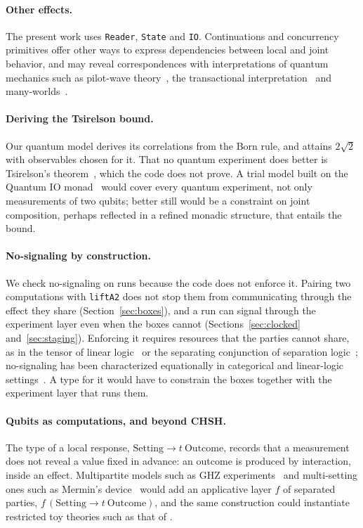 \documentclass[11pt]{article}
\newcommand{\hs}{\lstinline[style=hask,basicstyle=\ttfamily,frame=none]}
\begin{document}
\paragraph{Other effects.} The present work uses \hs|Reader|, \hs|State| and \hs|IO|. Continuations and concurrency primitives offer other ways to express dependencies between local and joint behavior, and may reveal correspondences with interpretations of quantum mechanics such as pilot-wave theory~\citep{Bohm1952}, the transactional interpretation~\citep{Cramer1986} and many-worlds~\citep{Everett1957}.

\paragraph{Deriving the Tsirelson bound.} Our quantum model derives its correlations from the Born rule, and attains $2\sqrt2$ with observables chosen for it. That no quantum experiment does better is Tsirelson's theorem~\citep{Tsirelson1980}, which the code does not prove. A trial model built on the Quantum IO monad~\citep{AltenkirchGreen2010} would cover every quantum experiment, not only measurements of two qubits; better still would be a constraint on joint composition, perhaps reflected in a refined monadic structure, that entails the bound.

\paragraph{No-signaling by construction.} We check no-signaling on runs because the code does not enforce it. Pairing two computations with \hs|liftA2| does not stop them from communicating through the effect they share (Section~\ref{sec:boxes}), and a run can signal through the experiment layer even when the boxes cannot (Sections~\ref{sec:clocked} and~\ref{sec:staging}). Enforcing it requires resources that the parties cannot share, as in the tensor of linear logic~\citep{Girard1987} or the separating conjunction of separation logic~\citep{Reynolds2002}; no-signaling has been characterized equationally in categorical and linear-logic settings~\citep{KissingerUijlen2017,LindenhoviusZamdzhiev2025}. A type for it would have to constrain the boxes together with the experiment layer that runs them.

\paragraph{Qubits as computations, and beyond CHSH.} The type of a local response, $\mathrm{Setting} \longrightarrow t\ \mathrm{Outcome}$, records that a measurement does not reveal a value fixed in advance: an outcome is produced by interaction, inside an effect. Multipartite models such as GHZ experiments~\citep{GHZ1990} and multi-setting ones such as Mermin's device~\citep{Mermin1981} would add an applicative layer $f$ of separated parties, $f\,(\mathrm{Setting} \longrightarrow t\ \mathrm{Outcome})$, and the same construction could instantiate restricted toy theories such as that of \citet{Spekkens2007}.
\end{document}
